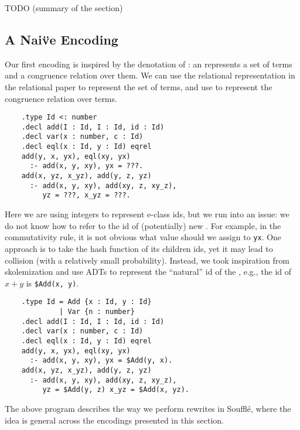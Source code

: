 TODO (summary of the section)

\subsection{A Nai\"ve Encoding}

Our first encoding is inspired by the denotation of \egraphs:
 an \egraph represents a set of terms and a congruence relation over them.
We can use the relational representation in the relational \ematching paper
 to represent the set of terms, 
 and use \eqrel{} to represent the congruence relation over terms.
\begin{verbatim}
    .type Id <: number
    .decl add(I : Id, I : Id, id : Id)
    .decl var(x : number, c : Id)
    .decl eql(x : Id, y : Id) eqrel
    add(y, x, yx), eql(xy, yx) 
      :- add(x, y, xy), yx = ???.
    add(x, yz, x_yz), add(y, z, yz) 
      :- add(x, y, xy), add(xy, z, xy_z), 
         yz = ???, x_yz = ???.
\end{verbatim}
Here we are using integers to represent e-class ids, 
 but we run into an issue:
 we do not know how to refer to the \eclass id
 of (potentially) new \eclasses.
For example,
 in the commutativity rule,
 it is not obvious what value should we assign to \verb|yx|.
One approach is to take the hash function of its children \eclass ids,
 yet it may lead to collision (with a relatively small probability).
Instead, we took inspiration from skolemization and use ADTs 
 to represent the ``natural'' \eclass id of the \enode,
 e.g., the id of $x+y$ is \verb|$Add(x, y)|.
\begin{verbatim}
    .type Id = Add {x : Id, y : Id}
             | Var {n : number}
    .decl add(I : Id, I : Id, id : Id)
    .decl var(x : number, c : Id)
    .decl eql(x : Id, y : Id) eqrel
    add(y, x, yx), eql(xy, yx) 
      :- add(x, y, xy), yx = $Add(y, x).
    add(x, yz, x_yz), add(y, z, yz) 
      :- add(x, y, xy), add(xy, z, xy_z), 
         yz = $Add(y, z) x_yz = $Add(x, yz).
\end{verbatim}
The above program describes the way we perform rewrites in Souffl\'e,
 where the idea is general across the encodings presented in this section.

